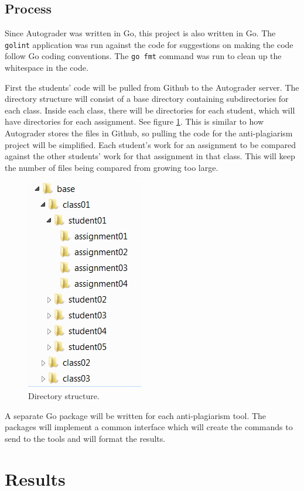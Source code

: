 \documentclass[12pt]{article}
\begin{document}
		\subsection{Process}
			Since Autograder was written in Go, this project is also written in Go. The \verb|golint| application was run against the code for suggestions on making the code follow Go coding conventions. The \verb|go fmt| command was run to clean up the whitespace in the code.
			
			First the students' code will be pulled from Github to the Autograder server. The directory structure will consist of a base directory containing subdirectories for each class. Inside each class, there will be directories for each student, which will have directories for each assignment. See figure \ref{fig:directories}. This is similar to how Autograder stores the files in Github, so pulling the code for the anti-plagiarism project will be simplified. Each student's work for an assignment to be compared against the other students' work for that assignment in that class. This will keep the number of files being compared from growing too large. 
			
			\begin{figure}[h!]
				\includegraphics[scale=0.75]{Directories.png}
				\caption{Directory structure.}
				\label{fig:directories}
			\end{figure}
			
			A separate Go package will be written for each anti-plagiarism tool. The packages will implement a common interface which will create the commands to send to the tools and will format the results.
			
	\section{Results}
\end{document}
